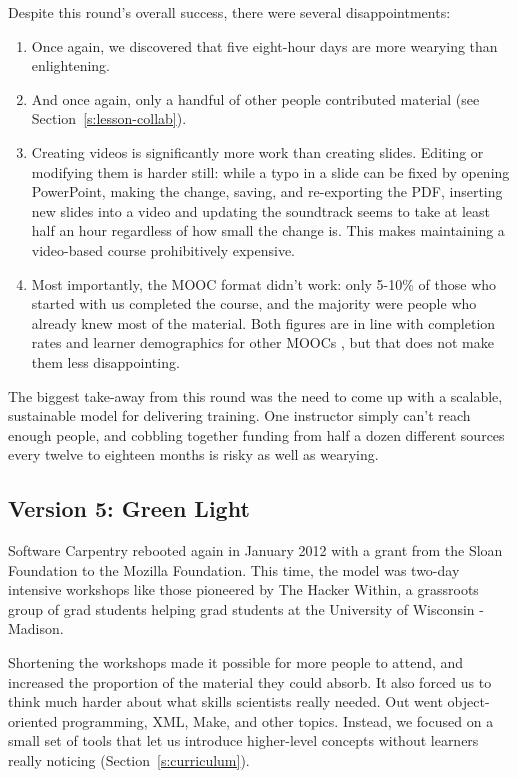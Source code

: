 \documentclass[10pt,a4paper,twocolumn]{article}
\begin{document}
Despite this round's overall success, there were several
disappointments:

\begin{enumerate}

\item
  Once again, we discovered that five eight-hour days are more wearying
  than enlightening.

\item
  And once again, only a handful of other people contributed material
  (see Section~\ref{s:lesson-collab}).

\item
  Creating videos is significantly more work than creating slides.
  Editing or modifying them is harder still: while a typo in a slide
  can be fixed by opening PowerPoint, making the change, saving, and
  re-exporting the PDF, inserting new slides into a video and updating
  the soundtrack seems to take at least half an hour regardless of how
  small the change is.  This makes maintaining a video-based course
  prohibitively expensive.

\item
  Most importantly, the MOOC format didn't work: only 5-10\% of those
  who started with us completed the course, and the majority were
  people who already knew most of the material. Both figures are in
  line with completion rates and learner demographics for other MOOCs
  \cite{jordan2013}, but that does not make them less disappointing.

\end{enumerate}

The biggest take-away from this round was the need to come up with a
scalable, sustainable model for delivering training. One instructor
simply can't reach enough people, and cobbling together funding from
half a dozen different sources every twelve to eighteen months is
risky as well as wearying.

\subsection{Version 5: Green Light}

Software Carpentry rebooted again in January 2012 with a grant from
the Sloan Foundation to the Mozilla Foundation.  This time, the model
was two-day intensive workshops like those pioneered by The Hacker
Within, a grassroots group of grad students helping grad students at
the University of Wisconsin - Madison.

Shortening the workshops made it possible for more people to attend,
and increased the proportion of the material they could absorb. It
also forced us to think much harder about what skills scientists
really needed. Out went object-oriented programming, XML, Make, and
other topics.  Instead, we focused on a small set of tools that let us
introduce higher-level concepts without learners really noticing
(Section~\ref{s:curriculum}).
\end{document}
